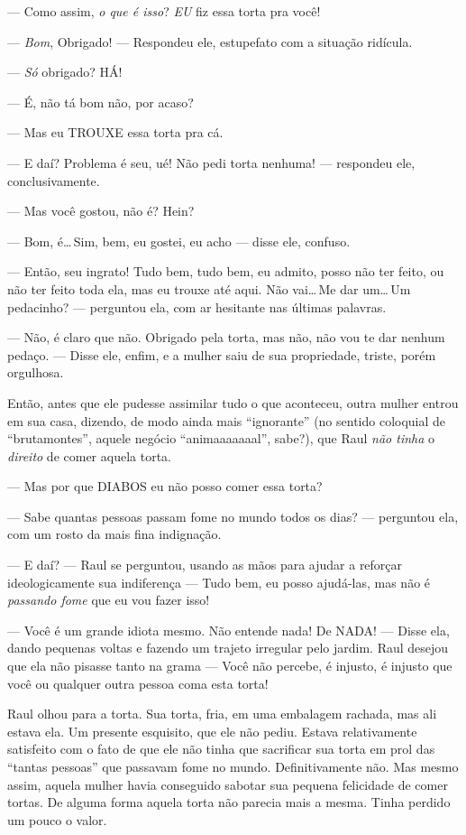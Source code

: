 --- Como assim, \emph{o que é isso}? \emph{EU} fiz essa torta pra você!

--- \emph{Bom}, Obrigado! --- Respondeu ele, estupefato com a situação ridícula.

--- \emph{Só} obrigado? HÁ!

--- É, não tá bom não, por acaso?

--- Mas eu TROUXE essa torta pra cá.

--- E daí? Problema é seu, ué! Não pedi torta nenhuma! --- respondeu ele, conclusivamente.

--- Mas você gostou, não é? Hein?

--- Bom, é\ldots\,Sim, bem, eu gostei, eu acho --- disse ele, confuso.

--- Então, seu ingrato! Tudo bem, tudo bem, eu admito, posso não ter feito, ou não ter feito toda ela, mas eu trouxe até aqui. Não vai\ldots\,Me dar um\ldots\,Um pedacinho? --- perguntou ela, com ar hesitante nas últimas palavras.

--- Não, é claro que não. Obrigado pela torta, mas não, não vou te dar nenhum pedaço. --- Disse ele, enfim, e a mulher saiu de sua propriedade, triste, porém orgulhosa.

Então, antes que ele pudesse assimilar tudo o que aconteceu, outra mulher entrou em sua casa, dizendo, de modo ainda mais ``ignorante'' (no sentido coloquial de ``brutamontes'', aquele negócio ``animaaaaaaal'', sabe?), que Raul \emph{não tinha} o \emph{direito} de comer aquela torta.

--- Mas por que DIABOS eu não posso comer essa torta?

--- Sabe quantas pessoas passam fome no mundo todos os dias? --- perguntou ela, com um rosto da mais fina indignação.

--- E daí? --- Raul se perguntou, usando as mãos para ajudar a reforçar ideologicamente sua indiferença --- Tudo bem, eu posso ajudá-las, mas não é \emph{passando fome} que eu vou fazer isso!

--- Você é um grande idiota mesmo. Não entende nada! De NADA! --- Disse ela, dando pequenas voltas e fazendo um trajeto irregular pelo jardim. Raul desejou que ela não pisasse tanto na grama --- Você não percebe, é injusto, é injusto que você ou qualquer outra pessoa coma esta torta!

Raul olhou para a torta. Sua torta, fria, em uma embalagem rachada, mas ali estava ela. Um presente esquisito, que ele não pediu. Estava relativamente satisfeito com o fato de que ele não tinha que sacrificar sua torta em prol das ``tantas pessoas'' que passavam fome no mundo. Definitivamente não. Mas mesmo assim, aquela mulher havia conseguido sabotar sua pequena felicidade de comer tortas. De alguma forma aquela torta não parecia mais a mesma. Tinha perdido um pouco o valor.

